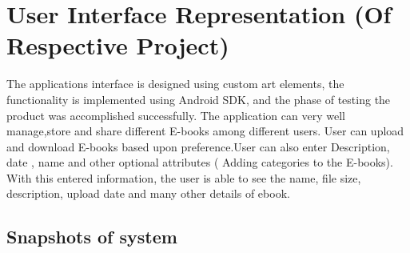 \section{User Interface Representation (Of  Respective Project)}

The applications interface is designed using custom art elements, the functionality is implemented using Android SDK, and the phase of testing the product was accomplished successfully. The application can very well manage,store and share different E-books among different users. User can upload and download E-books based upon preference.User can also enter
Description, date , name  and other optional attributes ( Adding categories  to the E-books). With this entered information, the user is able to see the name, file size, description, upload date and many other details of ebook.


\subsection{Snapshots of system}


